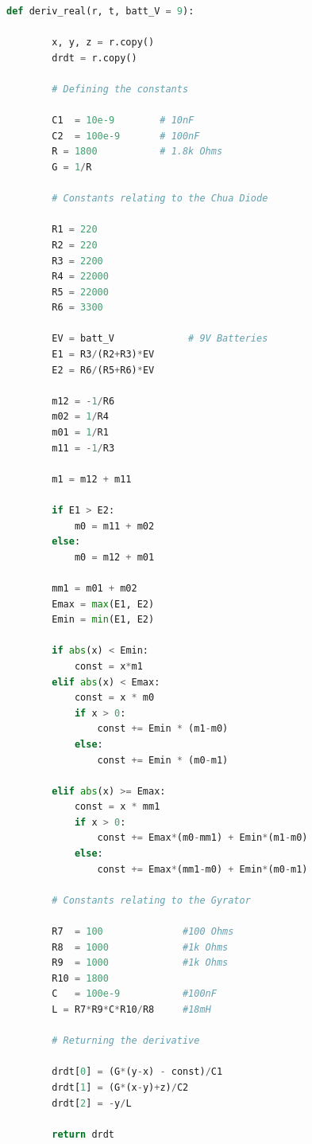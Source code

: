 \documentclass{article}
\begin{document}
    \begin{lstlisting}[language = Python]
        def deriv_real(r, t, batt_V = 9):
    
        x, y, z = r.copy()
        drdt = r.copy()
        
        # Defining the constants
        
        C1  = 10e-9        # 10nF
        C2  = 100e-9       # 100nF
        R = 1800           # 1.8k Ohms
        G = 1/R
        
        # Constants relating to the Chua Diode
        
        R1 = 220
        R2 = 220
        R3 = 2200
        R4 = 22000
        R5 = 22000
        R6 = 3300
        
        EV = batt_V             # 9V Batteries
        E1 = R3/(R2+R3)*EV
        E2 = R6/(R5+R6)*EV
        
        m12 = -1/R6
        m02 = 1/R4
        m01 = 1/R1
        m11 = -1/R3
        
        m1 = m12 + m11
        
        if E1 > E2:
            m0 = m11 + m02
        else:
            m0 = m12 + m01
        
        mm1 = m01 + m02
        Emax = max(E1, E2)
        Emin = min(E1, E2)
        
        if abs(x) < Emin:
            const = x*m1
        elif abs(x) < Emax:
            const = x * m0
            if x > 0:
                const += Emin * (m1-m0)
            else:
                const += Emin * (m0-m1)
        
        elif abs(x) >= Emax:
            const = x * mm1
            if x > 0:
                const += Emax*(m0-mm1) + Emin*(m1-m0)
            else:
                const += Emax*(mm1-m0) + Emin*(m0-m1)
                
        # Constants relating to the Gyrator
        
        R7  = 100              #100 Ohms
        R8  = 1000             #1k Ohms
        R9  = 1000             #1k Ohms
        R10 = 1800
        C   = 100e-9           #100nF
        L = R7*R9*C*R10/R8     #18mH 
        
        # Returning the derivative
        
        drdt[0] = (G*(y-x) - const)/C1
        drdt[1] = (G*(x-y)+z)/C2
        drdt[2] = -y/L
        
        return drdt
    \end{lstlisting}
    
\end{document}
